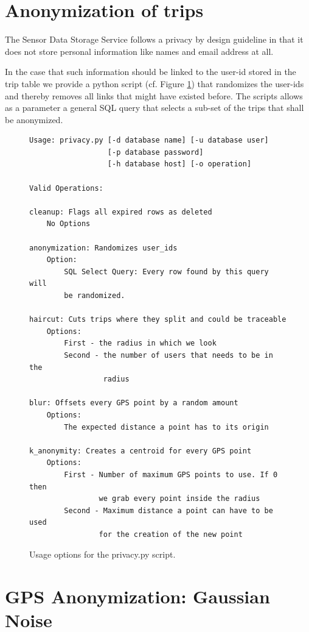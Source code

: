 \section{Anonymization of trips}
The Sensor Data Storage Service follows a privacy by design guideline
in that it does not store personal information like names and email
address at all.

In the case that such information should be linked to the user-id
stored in the trip table we provide a python script (cf. Figure
\ref{fig:privacypy}) that randomizes the user-ids and thereby removes
all links that might have existed before. The scripts allows as a
parameter a general SQL query that selects a sub-set of the trips that
shall be anonymized.

\begin{figure}[fontsize=\tiny]
\centering
\begin{verbatim}
Usage: privacy.py [-d database name] [-u database user]
                  [-p database password]
                  [-h database host] [-o operation]

Valid Operations:

cleanup: Flags all expired rows as deleted
    No Options

anonymization: Randomizes user_ids
    Option:
        SQL Select Query: Every row found by this query will
        be randomized.

haircut: Cuts trips where they split and could be traceable
    Options:
        First - the radius in which we look
        Second - the number of users that needs to be in the
                 radius

blur: Offsets every GPS point by a random amount
    Options:
        The expected distance a point has to its origin

k_anonymity: Creates a centroid for every GPS point
    Options:
        First - Number of maximum GPS points to use. If 0 then
                we grab every point inside the radius
        Second - Maximum distance a point can have to be used
                for the creation of the new point
\end{verbatim}
\caption{Usage options for the privacy.py script.}
\label{fig:privacypy}
\end{figure}

\section{GPS Anonymization: Gaussian Noise}

